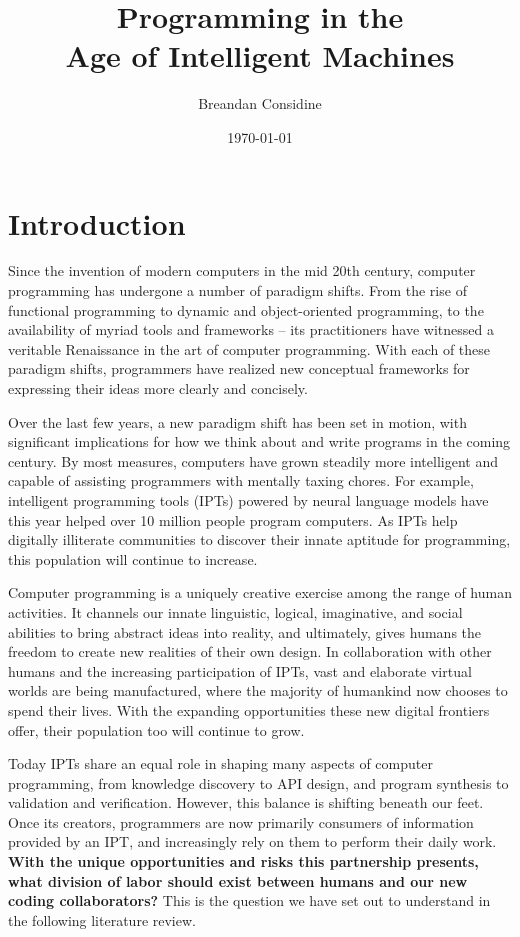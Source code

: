 \documentclass[12pt]{article}
\title{Programming in the \\Age of Intelligent Machines}
\author{Breandan Considine}
\date{\today}
\begin{document}
  \maketitle
  \tableofcontents
  \pagebreak\section{Introduction}

Since the invention of modern computers in the mid 20th century, computer programming has undergone a number of paradigm shifts. From the rise of functional programming to dynamic and object-oriented programming, to the availability of myriad tools and frameworks -- its practitioners have witnessed a veritable Renaissance in the art of computer programming. With each of these paradigm shifts, programmers have realized new conceptual frameworks for expressing their ideas more clearly and concisely.

Over the last few years, a new paradigm shift has been set in motion, with significant implications for how we think about and write programs in the coming century. By most measures, computers have grown steadily more intelligent and capable of assisting programmers with mentally taxing chores. For example, intelligent programming tools (IPTs) powered by neural language models have this year helped over 10 million people program computers. As IPTs help digitally illiterate communities to discover their innate aptitude for programming, this population will continue to increase.

Computer programming is a uniquely creative exercise among the range of human activities. It channels our innate linguistic, logical, imaginative, and social abilities to bring abstract ideas into reality, and ultimately, gives humans the freedom to create new realities of their own design. In collaboration with other humans and the increasing participation of IPTs, vast and elaborate virtual worlds are being manufactured, where the majority of humankind now chooses to spend their lives. With the expanding opportunities these new digital frontiers offer, their population too will continue to grow.

Today IPTs share an equal role in shaping many aspects of computer programming, from knowledge discovery to API design, and program synthesis to validation and verification. However, this balance is shifting beneath our feet. Once its creators, programmers are now primarily consumers of information provided by an IPT, and increasingly rely on them to perform their daily work. \textbf{With the unique opportunities and risks this partnership presents, what division of labor should exist between humans and our new coding collaborators?} This is the question we have set out to understand in the following literature review.
\end{document}
